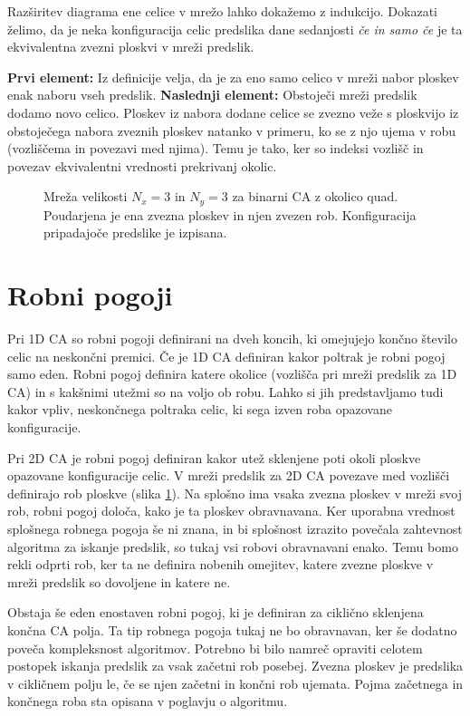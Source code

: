 \documentclass[12pt,a4paper,openany,twoside]{book}
\begin{document}
Razširitev diagrama ene celice v mrežo lahko dokažemo z indukcijo.
Dokazati želimo, da je neka konfiguracija celic predslika dane sedanjosti
\textit{če in samo če} je ta ekvivalentna zvezni ploskvi v mreži predslik.

\textbf{Prvi element:}
Iz definicije velja, da je za eno samo celico v mreži nabor ploskev enak naboru vseh predslik.
\textbf{Naslednji element:}
Obstoječi mreži predslik dodamo novo celico.
Ploskev iz nabora dodane celice se zvezno veže s ploskvijo
iz obstoječega nabora zveznih ploskev natanko v primeru,
ko se z njo ujema v robu (vozliščema in povezavi med njima).
Temu je tako, ker so indeksi vozlišč in povezav ekvivalentni vrednosti prekrivanj okolic.

\begin{figure}[htb]
\centerline{}
\caption[Mreža polja celic.]{Mreža velikosti \(N_x=3\) in \(N_y=3\) za binarni CA z okolico quad.
Poudarjena je ena zvezna ploskev in njen zvezen rob. Konfiguracija pripadajoče predslike je izpisana.}
\label{network_array}
\end{figure}

\section{Robni pogoji} 

Pri 1D CA so robni pogoji definirani na dveh koncih,
ki omejujejo končno število celic na neskončni premici.
Če je 1D CA definiran kakor poltrak je robni pogoj samo eden.
Robni pogoj definira katere okolice (vozlišča pri mreži predslik za 1D CA)
in s kakšnimi utežmi so na voljo ob robu.
Lahko si jih predstavljamo tudi kakor vpliv, neskončnega poltraka celic,
ki sega izven roba opazovane konfiguracije.

Pri 2D CA je robni pogoj definiran kakor utež sklenjene poti okoli ploskve opazovane konfiguracije celic.
V mreži predslik za 2D CA povezave med vozlišči definirajo rob ploskve (slika \ref{network_array}).
Na splošno ima vsaka zvezna ploskev v mreži svoj rob, robni pogoj določa, kako je ta ploskev obravnavana.
Ker uporabna vrednost splošnega robnega pogoja še ni znana,
in bi splošnost izrazito povečala zahtevnost algoritma za iskanje predslik,
so tukaj vsi robovi obravnavani enako. Temu bomo rekli odprti rob,
ker ta ne definira nobenih omejitev, katere zvezne ploskve v mreži predslik
so dovoljene in katere ne.

Obstaja še eden enostaven robni pogoj, ki je definiran za ciklično sklenjena končna CA polja.
Ta tip robnega pogoja tukaj ne bo obravnavan, ker še dodatno poveča kompleksnost algoritmov.
Potrebno bi bilo namreč opraviti celotem postopek iskanja predslik za vsak začetni rob posebej.
Zvezna ploskev je predslika v cikličnem polju le, če se njen začetni in končni rob ujemata.
Pojma začetnega in končnega roba sta opisana v poglavju o algoritmu.
\end{document}
